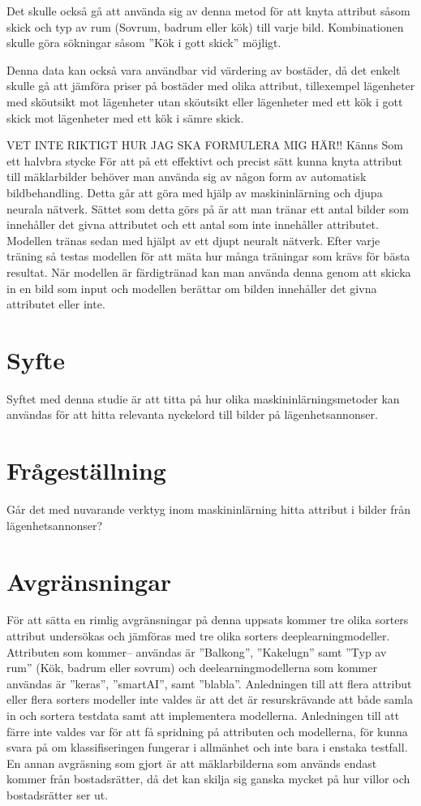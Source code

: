 \documentclass[]{kththesis}
\begin{document}
Det skulle också gå att använda sig av denna metod för att knyta attribut såsom skick och typ av rum (Sovrum, badrum eller kök) till varje bild.
Kombinationen skulle göra sökningar såsom ”Kök i gott skick” möjligt.  

Denna data kan också vara användbar vid värdering av bostäder, då det enkelt skulle gå att jämföra priser på bostäder med olika attribut, tillexempel lägenheter med sköutsikt mot lägenheter utan sköutsikt eller lägenheter med ett kök i gott skick mot lägenheter med ett kök i sämre skick.

VET INTE RIKTIGT HUR JAG SKA FORMULERA MIG HÄR!! Känns Som ett halvbra stycke
För att på ett effektivt och precist sätt kunna knyta attribut till mäklarbilder behöver man använda sig av någon form av automatisk bildbehandling.
Detta går att göra med hjälp av maskininlärning och djupa neurala nätverk.
Sättet som detta görs på är att man tränar ett antal bilder som innehåller det givna attributet och ett antal som inte innehåller attributet.
Modellen tränas sedan med hjälpt av ett djupt neuralt nätverk. 
Efter varje träning så testas modellen för att mäta hur många träningar som krävs för bästa resultat.
När modellen är färdigtränad kan man använda denna genom att skicka in en bild som input och modellen berättar om bilden innehåller det givna attributet eller inte.

\section{Syfte}
Syftet med denna studie är att titta på hur olika maskininlärningsmetoder kan användas för att hitta relevanta nyckelord till bilder på lägenhetsannonser. 

\section{Frågeställning}
Går det med nuvarande verktyg inom maskininlärning hitta attribut i bilder från lägenhetsannonser?

\section{Avgränsningar}
För att sätta en rimlig avgränsningar på denna uppsats kommer tre olika sorters attribut undersökas och jämföras med tre olika sorters deeplearningmodeller. 
Attributen som kommer– användas är ”Balkong”, ”Kakelugn” samt ”Typ av rum” (Kök, badrum eller sovrum) och deelearningmodellerna som kommer användas är ”keras”, ”smartAI”, samt ”blabla”. 
Anledningen till att flera attribut eller flera sorters modeller inte valdes är att det är resurskrävande att både samla in och sortera testdata samt att implementera modellerna. 
Anledningen till att färre inte valdes var för att få spridning på attributen och modellerna, för kunna svara på om klassifiseringen fungerar i allmänhet och inte bara i enstaka testfall. 
En annan avgräsning som gjort är att mäklarbilderna som används endast kommer från bostadsrätter, då det kan skilja sig ganska mycket på hur villor och bostadsrätter ser ut.
\end{document}
